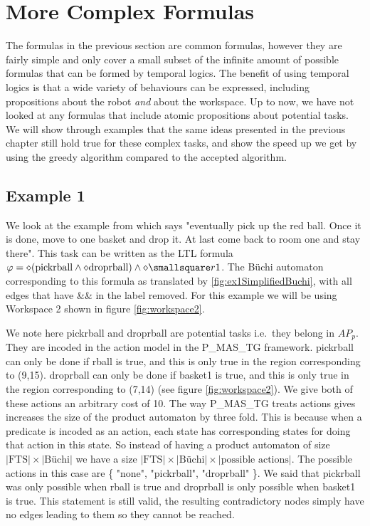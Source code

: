 \chapter{More Complex Formulas}
The formulas in the previous section are common formulas, however they are fairly simple and only cover a small subset of the infinite amount of possible formulas that can be formed by temporal logics. The benefit of using temporal logics is that a wide variety of behaviours can be expressed, including propositions about the robot \textit{and} about the workspace. Up to now, we have not looked at any formulas that include atomic propositions about potential tasks. We will show through examples that the same ideas presented in the previous chapter still hold true for these complex tasks, and show the speed up we get by using the greedy algorithm compared to the accepted algorithm. 

\section{Example 1}
We look at the example from \cite{guo15} which says "eventually pick up the red ball. Once it is done, move to one basket and drop it. At last come back to room one and stay there". This task can be written as the LTL formula $\varphi = \diamond (\text{pickrball} \wedge \diamond \text{droprball}) \wedge \diamond \smallsquare r1$. The B\"uchi automaton corresponding to this formula as translated by \ref{fig:ex1SimplifiedBuchi}, with all edges that have \&\& in the label removed. For this example we will be using Workspace 2 shown in figure \ref{fig:workspace2}.

We note here pickrball and droprball are potential tasks i.e.\ they belong in $AP_p$. They are incoded in the action model in the P\_MAS\_TG framework. pickrball can only be done if rball is true, and this is only true in the region corresponding to (9,15).  droprball can only be done if basket1 is true, and this is only true in the region corresponding to (7,14) (see figure \ref{fig:workspace2}). We give both of these actions an arbitrary cost of 10. The way P\_MAS\_TG treats actions gives increases the size of the product automaton by three fold. This is because when a predicate is incoded as an action, each state has corresponding states for doing that action in this state. So instead of having a product automaton of size $|\text{FTS}| \times |\text{B\"uchi}| $ we have a size $|\text{FTS}| \times |\text{B\"uchi}| \times |\text{possible actions}|$. The possible actions in this case are \{ "none", "pickrball", "droprball" \}. We said that pickrball was only possible when rball is true and droprball is only possible when basket1 is true. This statement is still valid, the resulting contradictory nodes simply have no edges leading to them so they cannot be reached. 

